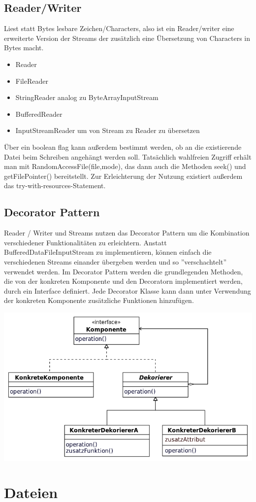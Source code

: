 \documentclass[12pt,a4]{article}
\begin{document}
\subsection{Reader/Writer}
	Liest statt Bytes lesbare Zeichen/Characters, also ist ein Reader/writer eine erweiterte Version der Streams der zusätzlich eine Übersetzung von Characters in Bytes macht.
	\begin{itemize}
		\item Reader
		\item FileReader
		\item StringReader analog zu ByteArrayInputStream
		\item BufferedReader
		\item InputStreamReader um von Stream zu Reader zu übersetzen
	\end{itemize}
Über ein boolean flag kann außerdem bestimmt werden, ob an die existierende Datei beim Schreiben angehängt werden soll. Tatsächlich wahlfreien Zugriff erhält man mit RandomAccessFile(file,mode), das dann auch die Methoden seek() und getFilePointer() bereitstellt. Zur Erleichterung der Nutzung existiert außerdem das try-with-resources-Statement.
\subsection{Decorator Pattern}
Reader / Writer und Streams nutzen das Decorator Pattern um die Kombination verschiedener Funktionalitäten zu erleichtern. Anstatt BufferedDataFileInputStream zu implementieren, können einfach die verschiedenen Streams einander übergeben werden und so ''verschachtelt'' verwendet werden. Im Decorator Pattern werden die grundlegenden Methoden, die von der konkreten Komponente und den Decoratorn implementiert werden, durch ein Interface definiert. Jede Decorator Klasse kann dann unter Verwendung der konkreten Komponente zusätzliche Funktionen hinzufügen.
\begin{center}
	\includegraphics[width=0.5\linewidth]{images/decorator}
\end{center}


\section{Dateien}
\end{document}
